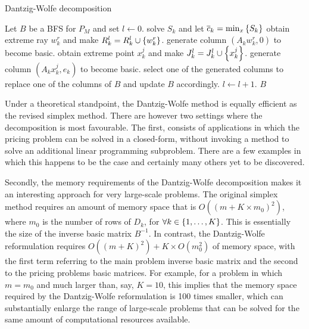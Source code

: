 \begin{algorithm}[h]
\caption{Dantzig-Wolfe decomposition} \label{p1c7:alg:DW}
\begin{algorithmic}[1] %
	Let $B$ be a BFS for $P_M$ and set $l \gets 0$. 
	\Repeat 
	        \State solve $S_k$ and let $\overline{c}_k = \min_x \left\{ S_k \right \}$
	        	\State obtain extreme ray $w_k^r$ and make $R_k^l = R_k^l \cup \left\{ w_k^r \right \}$.
	        	\State generate column $(A_kw_k^r, 0)$ to become basic.
	        	\State obtain extreme point $x_k^j$ and make $J_k^l = J_k^l \cup \left\{ x_k^j \right \}$.
	        	\State generate column $(A_kx_k^j, e_k)$ to become basic.
	        \EndIf  
	    \EndFor
			\State select one of the generated columns to replace one of the columns of $B$ and update $B$ accordingly. 
	    \State $l \gets l + 1$.            	
	 $B$
\end{algorithmic}  
\end{algorithm}

Under a theoretical standpoint, the Dantzig-Wolfe method is equally efficient as the revised simplex method. There are however two settings where the decomposition is most favourable. The first, consists of applications in which the pricing problem can be solved in a closed-form, without invoking a method to solve an additional linear programming subproblem. There are a few examples in which this happens to be the case and certainly many others yet to be discovered.

Secondly, the memory requirements of the Dantzig-Wolfe decomposition makes it an interesting approach for very large-scale problems. The original simplex method requires an amount of memory space that is $O((m + K \times m_0)^2)$, where $m_0$ is the number of rows of $D_k$, for $\forall k \in \left\{ 1,\dots, K \right \}$. This is essentially the size of the inverse basic matrix $B^{-1}$. In contrast, the Dantzig-Wolfe reformulation requires $O((m + K)^2) + K \times O(m_0^2)$ of memory space, with the first term referring to the main problem inverse basic matrix and the second to the pricing problems basic matrices. For example, for a problem in which $m = m_0$ and much larger than, say, $K=10$, this implies that the memory space required by the Dantzig-Wolfe reformulation is 100 times smaller, which can substantially enlarge the range of large-scale problems that can be solved for the same amount of computational resources available.


